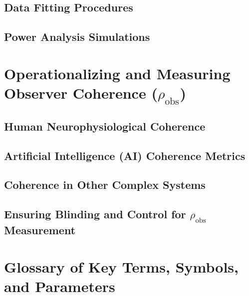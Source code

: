 \documentclass{report}
\begin{document}
    \section{Data Fitting Procedures}
    \label{app_sec:data_fitting_procedures}
    \section{Power Analysis Simulations}
    \label{app_sec:power_analysis_simulations}

\chapter{Operationalizing and Measuring Observer Coherence ($\rho_{\text{obs}}$)}
\label{app:op_measure_observer_coherence}
    \section{Human Neurophysiological Coherence}
    \label{app_sec:human_neurophys_coherence}
    \section{Artificial Intelligence (AI) Coherence Metrics}
    \label{app_sec:ai_coherence_metrics}
    \section{Coherence in Other Complex Systems}
    \label{app_sec:coherence_other_complex_systems}
    \section{Ensuring Blinding and Control for $\rho_{\text{obs}}$ Measurement}
    \label{app_sec:blinding_control_rho_obs}

\chapter{Glossary of Key Terms, Symbols, and Parameters}
\label{app:glossary}

%
\end{document}
